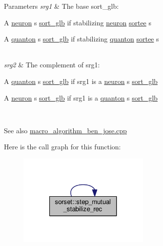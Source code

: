 \begin{DoxyParams}{Parameters}
{\em srg1} & The base sort\+\_\+glb\+:
\begin{DoxyItemize}
\item A \hyperlink{classneuron}{neuron} s \hyperlink{classsort__glb}{sort\+\_\+glb} if stabilizing \hyperlink{classneuron}{neuron} \hyperlink{classsortee}{sortee} s
\item A \hyperlink{classquanton}{quanton} s \hyperlink{classsort__glb}{sort\+\_\+glb} if stabilizing \hyperlink{classquanton}{quanton} \hyperlink{classsortee}{sortee} s 
\end{DoxyItemize}\\
\hline
{\em srg2} & The complement of srg1\+:
\begin{DoxyItemize}
\item A \hyperlink{classquanton}{quanton} s \hyperlink{classsort__glb}{sort\+\_\+glb} if srg1 is a \hyperlink{classneuron}{neuron} s \hyperlink{classsort__glb}{sort\+\_\+glb}
\item A \hyperlink{classneuron}{neuron} s \hyperlink{classsort__glb}{sort\+\_\+glb} if srg1 is a \hyperlink{classquanton}{quanton} s \hyperlink{classsort__glb}{sort\+\_\+glb} 
\end{DoxyItemize}\\
\hline
\end{DoxyParams}
\begin{DoxySeeAlso}{See also}
\hyperlink{macro__algorithm__ben__jose_8cpp}{macro\+\_\+algorithm\+\_\+ben\+\_\+jose.\+cpp} 
\end{DoxySeeAlso}


Here is the call graph for this function\+:\nopagebreak
\begin{figure}[H]
\begin{center}
\leavevmode
\includegraphics[width=184pt]{d3/d62/classsorset_a9a85b9412bc1fc5bea86d416e52b55c7_cgraph}
\end{center}
\end{figure}




